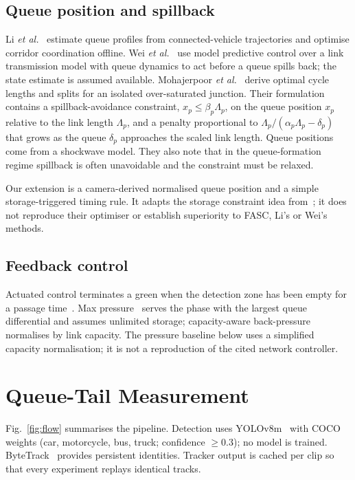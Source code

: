 \documentclass[journal]{IEEEtran}
\begin{document}
\subsection{Queue position and spillback}
Li \emph{et al.}~\cite{li2025} estimate queue profiles from connected-vehicle
trajectories and optimise corridor coordination offline. Wei \emph{et
al.}~\cite{wei2025} use model predictive control over a link transmission model with
queue dynamics to act before a queue spills back; the state estimate is assumed
available. Mohajerpoor \emph{et al.}~\cite{mohajerpoor2023} derive optimal cycle lengths
and splits for an isolated over-saturated junction. Their formulation contains a
spillback-avoidance constraint, $x_p \le \beta_p \Lambda_p$, on the queue position
$x_p$ relative to the link length $\Lambda_p$, and a penalty proportional to
$\Lambda_p/(\alpha_p\Lambda_p-\delta_p)$ that grows as the queue $\delta_p$ approaches the
scaled link length. Queue positions come from a shockwave model. They also note that in
the queue-formation regime spillback is often unavoidable and the constraint must be
relaxed.

\noindent Our extension is a camera-derived normalised queue position and a simple
storage-triggered timing rule. It adapts the storage constraint idea
from~\cite{mohajerpoor2023}; it does not reproduce their optimiser or establish
superiority to FASC, Li's or Wei's methods.

\subsection{Feedback control}
Actuated control terminates a green when the detection zone has been empty for a passage
time~\cite{stm2015}. Max pressure~\cite{varaiya2013} serves the phase with the largest
queue differential and assumes unlimited storage; capacity-aware back-pressure
\cite{gregoire2015} normalises by link capacity. The pressure baseline below uses a simplified capacity normalisation; it is not a reproduction of the cited network controller.

\section{Queue-Tail Measurement}\label{sec:measure}
Fig.~\ref{fig:flow} summarises the pipeline. Detection uses YOLOv8m~\cite{yolov8} with
COCO weights (car, motorcycle, bus, truck; confidence $\ge 0.3$); no model is trained.
ByteTrack~\cite{bytetrack} provides persistent identities. Tracker output is cached per
clip so that every experiment replays identical tracks.
\end{document}
